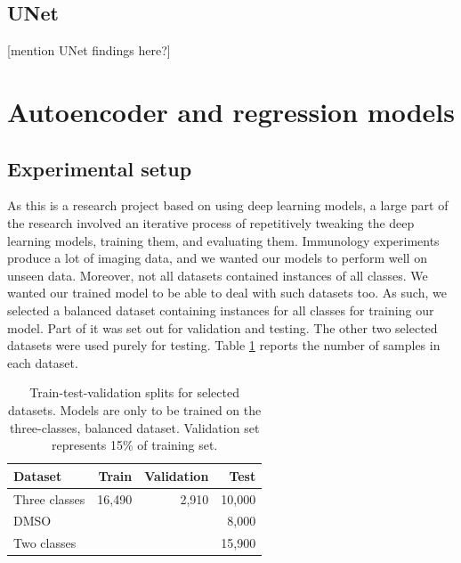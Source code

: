 \subsection{UNet}

[mention UNet findings here?]



\section{Autoencoder and regression models}

\subsection{Experimental setup}

As this is a research project based on using deep learning models, a large part of the research involved an iterative process of repetitively tweaking the deep learning models, training them, and evaluating them. Immunology experiments produce a lot of imaging data, and we wanted our models to perform well on unseen data. Moreover, not all datasets contained instances of all classes. We wanted our trained model to be able to deal with such datasets too. As such, we selected a balanced dataset containing instances for all classes for training our model. Part of it was set out for validation and testing. The other two selected datasets were used purely for testing. Table \ref{table:splits} reports the number of samples in each dataset.

\begin{table}[h]
\centering
\begin{tabular}{l|r|r|r}
\rowcolor[HTML]{EFEFEF}
Dataset       & Train  & Validation & Test   \\ \hline
Three classes & 16,490 & 2,910      & 10,000 \\
DMSO          &        &            & 8,000  \\
Two classes   &        &            & 15,900
\end{tabular}
\caption{Train-test-validation splits for selected datasets. Models are only to be trained on the three-classes, balanced dataset. Validation set represents 15\% of training set.}
\label{table:splits}
\end{table}

